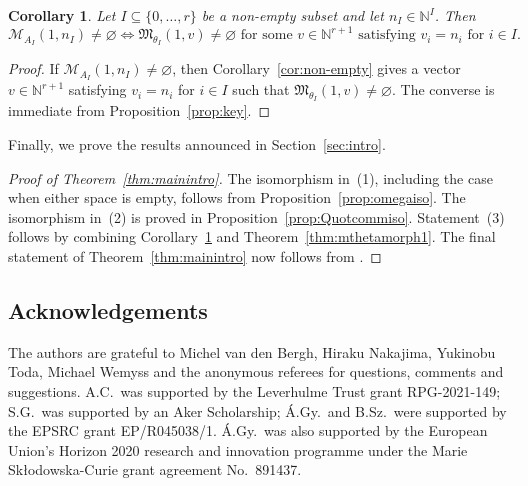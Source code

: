 \documentclass[pdftex]{sigma}%
\newtheorem{Corollary}[Theorem]{Corollary}
\newcommand{\PiQ}{A}
\numberwithin{equation}{section}
\begin{document}
\begin{Corollary}
\label{cor:MfMnonempty}
Let $I\subseteq \{0,\ldots, r\}$ be a non-empty subset and let $n_I\in {\mathbb N}^I$. Then
\[
\mathcal{M}_{\PiQ_I} (1,n_I)\neq \varnothing \iff \mathfrak{M}_{\theta_I}(1,v)\neq \varnothing\text{ for some }v\in \mathbb{N}^{r+1}\text{ satisfying }v_i=n_i\text{ for }i\in I.
\]
\end{Corollary}
\begin{proof}
If $\mathcal{M}_{\PiQ_I} (1,n_I)\neq \varnothing$, then Corollary~\ref{cor:non-empty} gives a vector $v\in \mathbb{N}^{r+1}$ satisfying $v_i=n_i$ for $i\in I$ such that $\mathfrak{M}_{\theta_I}(1,v)\neq \varnothing$. The converse is immediate from Proposition~\ref{prop:key}.
\end{proof}

Finally, we prove the results announced in Section~\ref{sec:intro}.
\begin{proof}[Proof of Theorem~\ref{thm:mainintro}]
The isomorphism in~(1), including the case when either space is empty, follows from Proposition~\ref{prop:omegaiso}. The isomorphism in~(2) is proved in Proposition~\ref{prop:Quotcommiso}. Statement~(3) follows by combining Corollary~\ref{cor:MfMnonempty} and Theorem~\ref{thm:mthetamorph1}. The final statement of Theorem~\ref{thm:mainintro} now
follows from \cite[Theorem~1.5]{bellamy2016symplectic}.
\end{proof}

\subsection*{Acknowledgements} The authors are grateful to Michel van den Bergh, Hiraku Nakajima, Yukinobu Toda, Michael Wemyss and the anonymous referees for questions, comments and suggestions. A.C.\ was supported by the Leverhulme Trust grant RPG-2021-149; S.G.~was supported by an Aker Scholarship; \'A.Gy.~and B.Sz.~were supported by
the EPSRC grant EP/R045038/1. \'A.Gy.~was also supported by the European Union's Horizon 2020
research and innovation programme under the Marie Sk{\l}odowska-Curie grant
agreement No.\ 891437.
\end{document}
